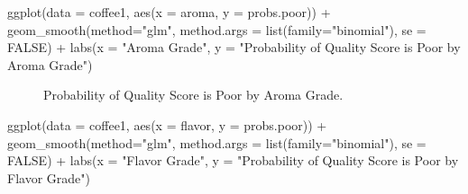 \documentclass[
  letterpaper,
  DIV=11,
  numbers=noendperiod]{scrartcl}
\newenvironment{Shaded}{\begin{snugshade}}{\end{snugshade}}
\newcommand{\AttributeTok}[1]{\textcolor[rgb]{0.40,0.45,0.13}{#1}}
\newcommand{\ConstantTok}[1]{\textcolor[rgb]{0.56,0.35,0.01}{#1}}
\newcommand{\FunctionTok}[1]{\textcolor[rgb]{0.28,0.35,0.67}{#1}}
\newcommand{\NormalTok}[1]{\textcolor[rgb]{0.00,0.23,0.31}{#1}}
\newcommand{\SpecialCharTok}[1]{\textcolor[rgb]{0.37,0.37,0.37}{#1}}
\newcommand{\StringTok}[1]{\textcolor[rgb]{0.13,0.47,0.30}{#1}}
\begin{document}
\begin{Shaded}
\begin{Highlighting}[]
\FunctionTok{ggplot}\NormalTok{(}\AttributeTok{data =}\NormalTok{ coffee1, }\FunctionTok{aes}\NormalTok{(}\AttributeTok{x =}\NormalTok{ aroma, }\AttributeTok{y =}\NormalTok{ probs.poor)) }\SpecialCharTok{+}
  \FunctionTok{geom\_smooth}\NormalTok{(}\AttributeTok{method=}\StringTok{"glm"}\NormalTok{, }
              \AttributeTok{method.args =} \FunctionTok{list}\NormalTok{(}\AttributeTok{family=}\StringTok{"binomial"}\NormalTok{), }
              \AttributeTok{se =} \ConstantTok{FALSE}\NormalTok{) }\SpecialCharTok{+}
  \FunctionTok{labs}\NormalTok{(}\AttributeTok{x =} \StringTok{"Aroma Grade"}\NormalTok{, }
       \AttributeTok{y =} \StringTok{"Probability of Quality Score is Poor by Aroma Grade"}\NormalTok{)}
\end{Highlighting}
\end{Shaded}

\begin{figure}[H]


\caption{\label{fig-prob1}Probability of Quality Score is Poor by Aroma
Grade.}

\end{figure}%

\begin{Shaded}
\begin{Highlighting}[]
\FunctionTok{ggplot}\NormalTok{(}\AttributeTok{data =}\NormalTok{ coffee1, }\FunctionTok{aes}\NormalTok{(}\AttributeTok{x =}\NormalTok{ flavor, }\AttributeTok{y =}\NormalTok{ probs.poor)) }\SpecialCharTok{+}
  \FunctionTok{geom\_smooth}\NormalTok{(}\AttributeTok{method=}\StringTok{"glm"}\NormalTok{, }
              \AttributeTok{method.args =} \FunctionTok{list}\NormalTok{(}\AttributeTok{family=}\StringTok{"binomial"}\NormalTok{), }
              \AttributeTok{se =} \ConstantTok{FALSE}\NormalTok{) }\SpecialCharTok{+}
  \FunctionTok{labs}\NormalTok{(}\AttributeTok{x =} \StringTok{"Flavor Grade"}\NormalTok{, }
       \AttributeTok{y =} \StringTok{"Probability of Quality Score is Poor by Flavor Grade"}\NormalTok{)}
\end{Highlighting}
\end{Shaded}
\end{document}
